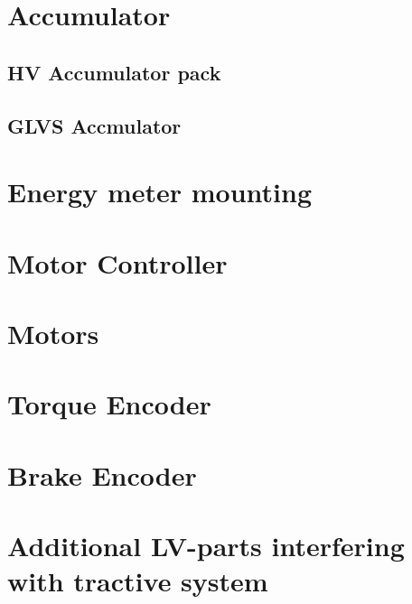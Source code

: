 \documentclass{article}[12pt]
\begin{document}
\newpage
\section{Accumulator}\label{sec:Accumualtor}
\subsection{HV Accumulator pack}\label{subsec:AccumulatorPack1}


\subsection{GLVS Accmulator}


\newpage
\section{Energy meter mounting}\label{sec:DataLogger}


\newpage
\section{Motor Controller}\label{sec:MotorController}


\newpage
\section{Motors}\label{sec:Motors}


\newpage
\section{Torque Encoder}\label{sec:TorqueEncoder}


\newpage
\section{Brake Encoder}\label{sec:BrakeEncoder}%


\newpage
\section{Additional LV-parts interfering with tractive system}\label{sec:AdditionalLV}

\end{document}
